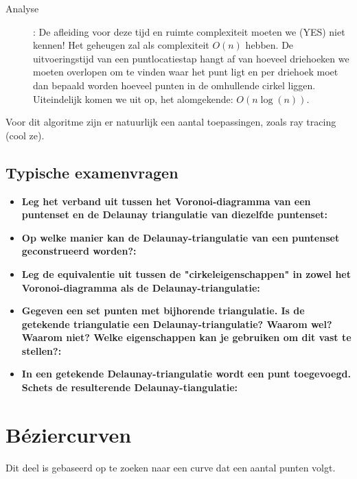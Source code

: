 \documentclass[12pt,a4paper]{article}
\begin{document}
\begin{description}
		\item[Analyse]: 
		De afleiding voor deze tijd en ruimte complexiteit moeten we (YES) niet kennen! Het geheugen zal als complexiteit $O(n)$ hebben. De uitvoeringstijd van een puntlocatiestap hangt af van hoeveel driehoeken we moeten overlopen om te vinden waar het punt ligt en per driehoek moet dan bepaald worden hoeveel punten in de omhullende cirkel liggen. Uiteindelijk komen we uit op, het alomgekende: $O(n\log(n))$. 
	\end{description}
	
	Voor dit algoritme zijn er natuurlijk een aantal toepassingen, zoals ray tracing (cool ze). 
	
	
	\subsection{Typische examenvragen}
	\begin{itemize}
		\item \textbf{Leg het verband uit tussen het Voronoi-diagramma van een puntenset en de Delaunay triangulatie van diezelfde puntenset:}\\
		\item \textbf{Op welke manier kan de Delaunay-triangulatie van een puntenset geconstrueerd worden?:}\\
		\item \textbf{Leg de equivalentie uit tussen de "cirkeleigenschappen" in zowel het Voronoi-diagramma als de Delaunay-triangulatie:}\\
		\item \textbf{Gegeven een set punten met bijhorende triangulatie. Is de getekende triangulatie een Delaunay-triangulatie? Waarom wel? Waarom niet? Welke eigenschappen kan je gebruiken om dit vast te stellen?:}\\
		\item \textbf{In een getekende Delaunay-triangulatie wordt een punt toegevoegd. Schets de resulterende Delaunay-tiangulatie:}\\
	\end{itemize}
	
	
	\section{Béziercurven}
	Dit deel is gebaseerd op te zoeken naar een curve dat een aantal punten volgt. 
	
\end{document}
